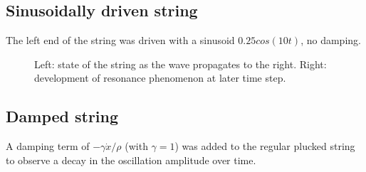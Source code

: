 \documentclass[12pt]{article}
\begin{document}
\subsection{Sinusoidally driven string}

The left end of the string was driven with a sinusoid
$0.25cos{(10t)}$, no damping.

\begin{figure}[H]
  \caption{Left: state of the string as the wave propagates to the right.
  Right: development of resonance phenomenon at later time step.}
\end{figure}

\subsection{Damped string}

A damping term of $-\gamma \dot{x} / \rho$ (with $\gamma = 1$) was added
to the regular plucked string to observe a decay in the oscillation amplitude
over time.
\end{document}
